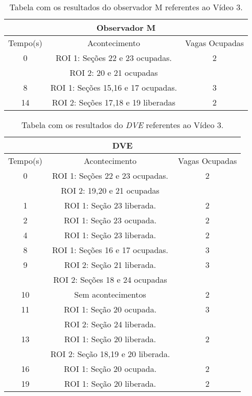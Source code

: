 \begin{table}[H]
\begin{center}
\begin{tabular}{|c||c||c|}
\hline
\multicolumn{3}{|c|}{Observador M}  \\ \hline \hline
Tempo(s) & Acontecimento & Vagas Ocupadas\\ \hline
0 & ROI 1: Seções 22 e 23 ocupadas. & 2 \\
 & ROI 2: 20 e 21 ocupadas & \\ \hline
8 & ROI 1: Seções 15,16 e 17 ocupadas. & 3 \\ \hline
14 & ROI 2: Seções 17,18 e 19 liberadas & 2\\
\hline
\end{tabular}
\end{center}
\caption{Tabela com os resultados do observador M referentes ao Vídeo 3.}
\label{tab:video3M}
\end{table}

\begin{table}[H]
\begin{center}
\begin{tabular}{|c||c||c|}
\hline
\multicolumn{3}{|c|}{DVE}  \\ \hline \hline
Tempo(s) & Acontecimento & Vagas Ocupadas\\ \hline
0 & ROI 1: Seções 22 e 23 ocupadas. & 2 \\
 & ROI 2: 19,20 e 21 ocupadas &  \\ \hline
1 & ROI 1: Seção 23 liberada. & 2 \\ \hline
2 & ROI 1: Seção 23 ocupada. & 2 \\ \hline
4 & ROI 1: Seção 23 liberada. & 2 \\ \hline
8 & ROI 1: Seções 16 e 17 ocupadas. & 3 \\ \hline
9 & ROI 2: Seção 21 liberada. & 3 \\ 
 & ROI 2: Seções 18 e 24 ocupadas &  \\ \hline
10 & Sem acontecimentos & 2 \\ \hline
11 & ROI 1: Seção 20 ocupada. & 3 \\ 
 & ROI 2: Seção 24 liberada. \\ \hline
13 & ROI 1: Seção 20 liberada. & 2 \\
 & ROI 2: Seção 18,19 e 20 liberada. & \\ \hline
16 & ROI 1: Seção 20 ocupada. & 2 \\ \hline
19 & ROI 1: Seção 20 liberada. & 2 \\
\hline
\end{tabular}
\end{center}
\caption{Tabela com os resultados do \textit{DVE} referentes ao Vídeo 3.}
\label{tab:video3}
\end{table}

